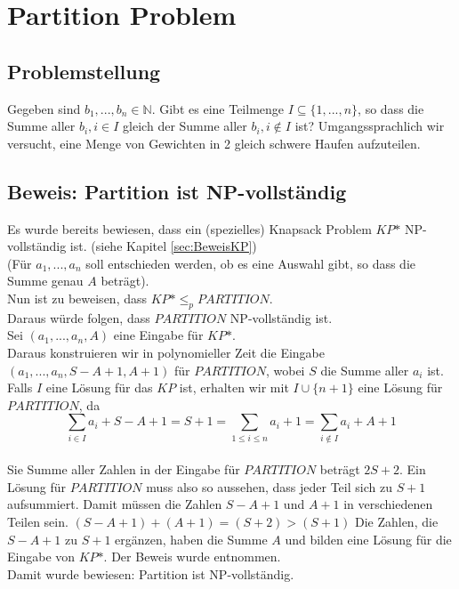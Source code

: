 \documentclass[ngerman]{article}
\begin{document}
\section{Partition Problem}
\subsection{Problemstellung}
Gegeben sind \(b_1,...,b_n \in \mathbb{N}\). Gibt es eine Teilmenge \(I \subseteq \{1,...,n\}\), so dass die Summe aller \(b_i, i \in I\) gleich der Summe aller \(b_i, i \notin I\) ist?
Umgangssprachlich wir versucht, eine Menge von Gewichten in 2 gleich schwere Haufen aufzuteilen.

\subsection{Beweis: Partition ist NP-vollständig}
Es wurde bereits bewiesen, dass ein (spezielles) Knapsack Problem \(KP\mbox{*}\) NP-vollständig ist. (siehe Kapitel \vref{sec:BeweisKP})\\
(Für \(a_1,...,a_n\) soll entschieden werden, ob es eine Auswahl gibt, so dass die Summe genau \(A\) beträgt).\\
Nun ist zu beweisen, dass \(KP\mbox{*} \leq_p PARTITION\).\\
Daraus würde folgen, dass $PARTITION$ NP-vollständig ist.\\
Sei \((a_1,...,a_n,A)\) eine Eingabe für \(KP\mbox{*}\).\\
Daraus konstruieren wir in polynomieller Zeit die Eingabe\\
\((a_1,...,a_n,S-A+1,A+1)\) für \(PARTITION\), wobei \(S\) die Summe aller \(a_i\) ist.\\
Falls \(I\) eine Lösung für das \(KP\) ist, erhalten wir mit \(I \cup \{n+1\}\) eine Lösung für \(PARTITION\), da\\
$$\sum_{i \in I}a_i + S - A + 1 = S + 1 = \sum_{1 \le i \le n}a_i + 1 = \sum_{i \notin I}a_i + A + 1$$\\
Sie Summe aller Zahlen in der Eingabe für \(PARTITION\) beträgt \(2S + 2\).
Ein Lösung für \(PARTITION\) muss also so aussehen, dass jeder Teil sich zu \(S + 1\) aufsummiert.
Damit müssen die Zahlen \(S - A + 1\) und \(A + 1\) in verschiedenen Teilen sein.
\((S - A + 1) + (A + 1) = (S + 2) > (S + 1)\)
Die Zahlen, die \(S - A + 1\) zu \(S + 1\) ergänzen, haben die Summe \(A\) und bilden eine Lösung für die Eingabe von \(KP\mbox{*}\).
Der Beweis wurde \cite{wegener} entnommen.\\
Damit wurde bewiesen: Partition ist NP-vollständig.
\end{document}
